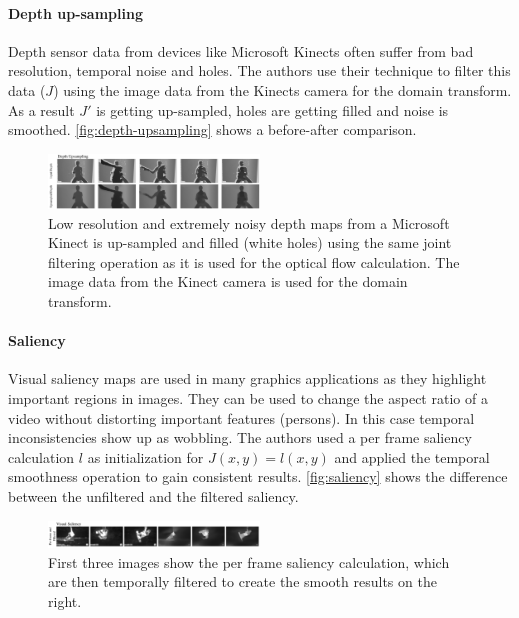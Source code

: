 \documentclass{utue} %
\begin{document}
\paragraph{Depth up-sampling} \label{up-sampling}
Depth sensor data from devices like Microsoft Kinects often suffer from bad
resolution, temporal noise and holes. The authors use their technique to filter
this data ($J$) using the image data from the Kinects camera for the domain
transform. As a result $J'$ is getting up-sampled, holes are getting filled and
noise is smoothed. \autoref{fig:depth-upsampling} shows a before-after
comparison.
\begin{figure}[htb]
  \centering
  \includegraphics[width=0.5\textwidth]{images/depth.png}
  \caption{Low resolution and extremely noisy depth maps from a Microsoft Kinect
  is up-sampled and filled (white holes) using the same joint filtering
operation as it is used for the optical flow calculation. The image data from
the Kinect camera is used for the domain transform.}
  \label{fig:depth-upsampling}
\end{figure}

\paragraph{Saliency} \label{saliency}
Visual saliency maps are used in many graphics applications as they highlight
important regions in images. They can be used to change the aspect ratio of a
video without distorting important features (persons). In this case temporal
inconsistencies show up as wobbling. The authors used a per frame saliency
calculation $l$ as initialization for $J(x,y) = l(x,y)$ and applied the temporal
smoothness operation to gain consistent results. \autoref{fig:saliency} shows
the difference between the unfiltered and the filtered saliency.
\begin{figure}[htb]
  \centering
  \includegraphics[width=0.5\textwidth]{images/saliency.png}
  \caption{First three images show the per frame saliency calculation, which are
  then temporally filtered to create the smooth results on the right.}
  \label{fig:saliency}
\end{figure}
\end{document}
